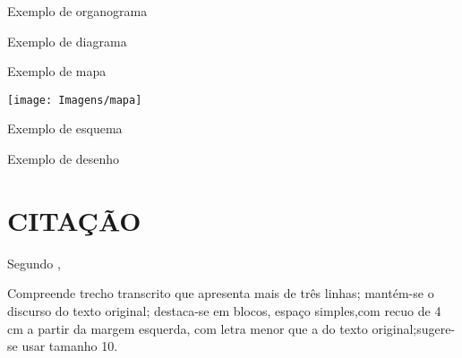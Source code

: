 \begin{organograma}[htb]
	\caption{Exemplo de organograma}
	\label{orga:grafico5}
\end{organograma}
\begin{diagrama}[htb]
	\caption{Exemplo de diagrama}
	\label{diag:grafico6}
\end{diagrama}

\begin{mapa}[htb]
	\caption{Exemplo de mapa}
	\label{map:grafico7}
 	\texttt{[image: Imagens/mapa]}
\end{mapa}

\begin{esquema}[htb]
	\caption{Exemplo de esquema}
	\label{esq:grafico10}
\end{esquema}

\clearpage

\begin{desenho}[htb]
	\caption{Exemplo de desenho}
	\label{des:grafico9}
\end{desenho}
\cleardoublepage

\section{CITAÇÃO}

Segundo  ,
\begin{citacao}
Compreende trecho transcrito que apresenta mais de três linhas; mantém-se o discurso do texto original; destaca-se em blocos, espaço simples,com recuo de 4 cm a partir da margem esquerda, com letra menor que a do texto original;sugere-se usar tamanho 10.
\end{citacao}

